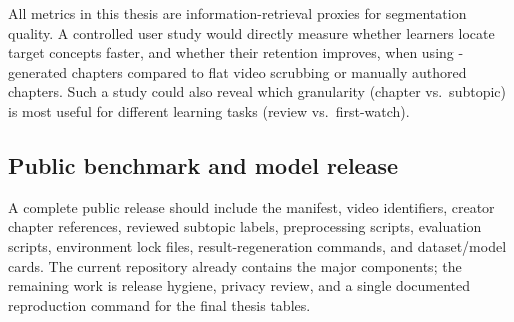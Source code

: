 All metrics in this thesis are information-retrieval proxies for segmentation
quality.
A controlled user study would directly measure whether learners locate
target concepts faster, and whether their retention improves, when using
\lecseg{}-generated chapters compared to flat video scrubbing or manually
authored chapters.
Such a study could also reveal which granularity (chapter vs.\ subtopic)
is most useful for different learning tasks (review vs.\ first-watch).

\subsection{Public benchmark and model release}

A complete public release should include the manifest, video identifiers,
creator chapter references, reviewed subtopic labels, preprocessing scripts,
evaluation scripts, environment lock files, result-regeneration commands, and
dataset/model cards. The current repository already contains the major
components; the remaining work is release hygiene, privacy review, and a
single documented reproduction command for the final thesis tables.
